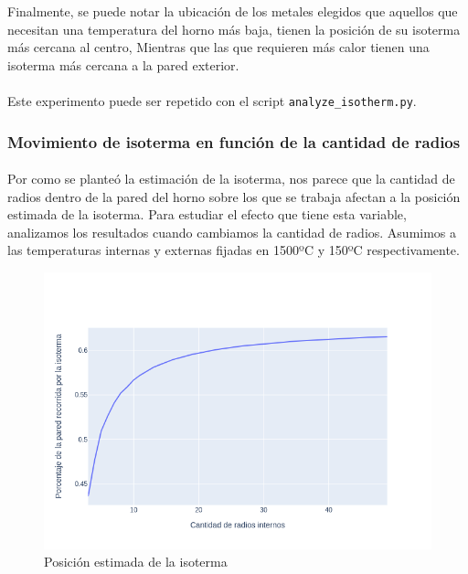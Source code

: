 \documentclass[12pt]{article}
\begin{document}
Finalmente, se puede notar la ubicación de los metales elegidos que aquellos que necesitan una temperatura del horno más baja, tienen la posición de su isoterma más cercana al centro, Mientras que las que requieren más calor tienen una isoterma más cercana a la pared exterior. 

\paragraph{} Este experimento puede ser repetido con el script \texttt{analyze\_isotherm.py}.

\subsubsection{Movimiento de isoterma en función de la cantidad de radios}

\paragraph{} Por como se planteó la estimación de la isoterma, nos parece que la cantidad de radios dentro de la pared del horno sobre los que se trabaja afectan a la posición estimada de la isoterma. Para estudiar el efecto que tiene esta variable, analizamos los resultados cuando cambiamos la cantidad de radios. Asumimos a las temperaturas internas y externas fijadas en 1500ºC y 150ºC respectivamente. \\

\begin{figure}[H]
\centering
\includegraphics[scale=0.5]{isotherm_by_radii}
\caption{Posición estimada de la isoterma}
\label{fig:isotherm_by_radii}
\end{figure}
\end{document}
